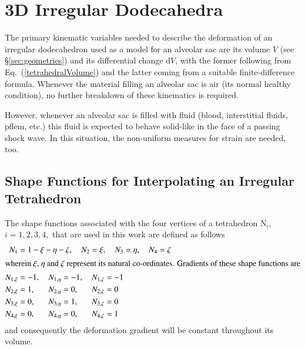 \section{3D Irregular Dodecahedra}

The primary kinematic variables needed to describe the deformation of an irregular dodecahedron used as a model for an alveolar sac are its volume $V$ (see \S\ref{sec:geometries}) and its differential change $\mathrm{d}V$, with the former following from Eq.~(\ref{tetrahedralVolume}) and the latter coming from a suitable finite-difference formula.  Whenever the material filling an alveolar sac is air (its normal healthy condition), no further breakdown of these kinematics is required.  

However, whenever an alveolar sac is filled with fluid (blood, interstitial fluids, pflem, etc.) this fluid is expected to behave solid-like in the face of a passing shock wave.  In this situation, the non-uniform measures for strain are needed, too.

\subsection{Shape Functions for Interpolating an Irregular Tetrahedron}

The shape functions associated with the four vertices of a tetrahedron $\mathrm{N}_i$, $i = 1, 2, 3, 4,$ that are used in this work are defined as follows
\begin{subequations}
    \begin{align}
    N_1 & = 1 - \xi - \eta - \zeta , \quad
    N_2 = \xi , \quad
    N_3 = \eta , \quad
    N_4 = \zeta \\
    \intertext{wherein $\xi$, $\eta$ and $\zeta$ represent its natural co-ordinates. Gradients of these shape functions are} 
    N_{1,\xi} & = -1 , \quad N_{1,\eta} = -1 , \quad N_{1,\zeta} = -1 \notag \\
    N_{2,\xi} & = 1 , \quad \phantom{-} N_{2,\eta} = 0 , \quad \phantom{-} N_{2,\zeta} = 0 \notag \\
    N_{3,\xi} & = 0 , \quad \phantom{-} N_{3,\eta} = 1 , \quad \phantom{-} N_{3,\zeta} = 0 \notag \\
    N_{4,\xi} & = 0 , \quad \phantom{-} N_{4,\eta} = 0 , \quad \phantom{-} N_{4,\zeta} = 1 
    \end{align}
\end{subequations}
and consequently the deformation gradient will be constant throughout its volume.

